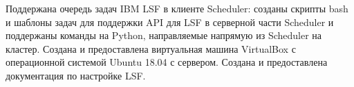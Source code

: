 


Поддержана очередь задач IBM LSF в клиенте Scheduler: созданы скрипты bash и шаблоны задач для поддержки API для LSF в серверной части Scheduler и поддержаны команды на Python, направляемые напрямую из Scheduler на кластер. Создана и предоставлена виртуальная машина VirtualBox с операционной системой Ubuntu 18.04 с сервером. Создана и предоставлена документация по настройке LSF.

\clearpage
